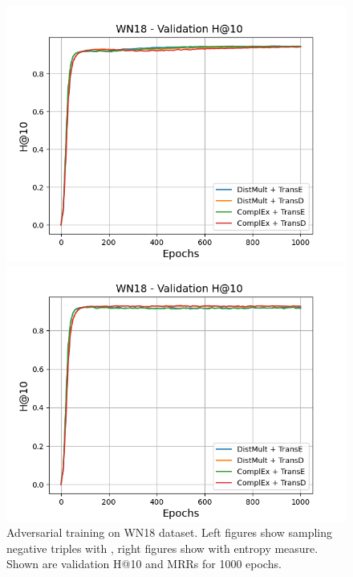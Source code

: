\begin{figure}[H]
\begin{minipage}{.45\textwidth}
      \includegraphics[width=0.9\linewidth]{figures/results/gan_train/not_pretrained/random/wn18/epochs1000/random_wn18_hit10.png}
    \end{minipage}%
    \begin{minipage}{.45\textwidth}
      \centering
      \includegraphics[width=0.9\linewidth]{figures/results/gan_train/not_pretrained/uncertainty/max_distribution/entropy/wn18/1k_epochs/uncertainty_wn18_hit10.png}
    \end{minipage}%
    \caption{Adversarial training on \textsc{WN18} dataset. 
    Left figures show sampling negative triples with \origsampling, right figures show \ussoftmax with entropy measure.
    Shown are validation H@10 and MRRs for 1000 epochs.}
    \label{fig:advtrain_wn18_random_vs_uncertainty}
\end{figure}

